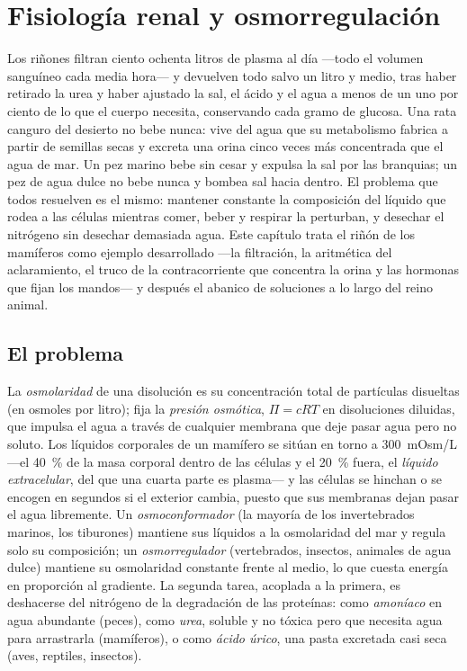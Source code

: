 \chapter{Fisiología renal y osmorregulación}\label{ch:b3:renal-osmoregulation}

Los riñones filtran ciento ochenta litros de plasma al día ---todo el
volumen sanguíneo cada media hora--- y devuelven todo salvo un litro y
medio, tras haber retirado la urea y haber ajustado la sal, el ácido y
el agua a menos de un uno por ciento de lo que el cuerpo necesita,
conservando cada gramo de glucosa. Una rata canguro del desierto no
bebe nunca: vive del agua que su metabolismo fabrica a partir de
semillas secas y excreta una orina cinco veces más concentrada que el
agua de mar. Un pez marino bebe sin cesar y expulsa la sal por las
branquias; un pez de agua dulce no bebe nunca y bombea sal hacia
dentro. El problema que todos resuelven es el mismo: mantener constante
la composición del líquido que rodea a las células mientras comer,
beber y respirar la perturban, y desechar el nitrógeno sin desechar
demasiada agua. Este capítulo trata el riñón de los mamíferos como
ejemplo desarrollado ---la filtración, la aritmética del aclaramiento,
el truco de la contracorriente que concentra la orina y las hormonas
que fijan los mandos--- y después el abanico de soluciones a lo largo
del reino animal.

\section{El problema}

\begin{definition}[La osmorregulación]\label{def:b3:renal-osmoregulation:problem}
La \emph{osmolaridad} de una disolución es su concentración total de
partículas disueltas (en osmoles por litro); fija la \emph{presión
osmótica}, $\Pi = cRT$ en disoluciones diluidas, que impulsa el agua a
través de cualquier membrana que deje pasar agua pero no soluto. Los
líquidos corporales de un mamífero se sitúan en torno a
\qty{300}{mOsm/L} ---el \qty{40}{\%} de la masa corporal dentro de las
células y el \qty{20}{\%} fuera, el \emph{líquido extracelular}, del
que una cuarta parte es plasma--- y las células se hinchan o se encogen
en segundos si el exterior cambia, puesto que sus membranas dejan pasar
el agua libremente. Un \emph{osmoconformador} (la mayoría de los
invertebrados marinos, los tiburones) mantiene sus líquidos a la
osmolaridad del mar y regula solo su composición; un
\emph{osmorregulador} (vertebrados, insectos, animales de agua dulce)
mantiene su osmolaridad constante frente al medio, lo que cuesta
energía en proporción al gradiente. La segunda tarea, acoplada a la
primera, es deshacerse del nitrógeno de la degradación de las
proteínas: como \emph{amoníaco} en agua abundante (peces), como
\emph{urea}, soluble y no tóxica pero que necesita agua para
arrastrarla (mamíferos), o como \emph{ácido úrico}, una pasta excretada
casi seca (aves, reptiles, insectos).
\end{definition}

